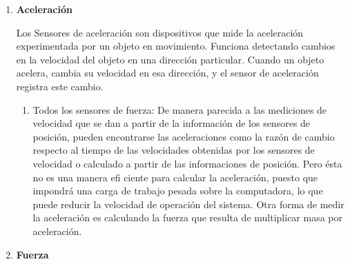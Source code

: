 \begin{enumerate}
\begin{enumerate}
			\begin{figure}[h]
				\centering
				\hfill
			\end{figure}
			
			\end{enumerate}
			
			\item \textbf{Aceleración}
			
			Los Sensores de aceleración son dispositivos que mide la aceleración experimentada por un objeto en movimiento. Funciona detectando cambios en la velocidad del objeto en una dirección particular. Cuando un objeto acelera, cambia su velocidad en esa dirección, y el sensor de aceleración registra este cambio. \cite{Aceleración} \\
			
			\begin{enumerate}
				\item Todos los sensores de fuerza: De manera parecida a las mediciones de velocidad que se dan a partir de la información de los sensores de posición, pueden encontrarse las aceleraciones como la razón de cambio respecto al tiempo de las velocidades obtenidas por los sensores de velocidad o calculado a partir de las informaciones de posición. Pero ésta no es una manera efi ciente para calcular la aceleración, puesto que impondrá una carga de trabajo pesada sobre la computadora, lo que puede reducir la velocidad de operación del sistema. Otra forma de medir la aceleración es calculando la fuerza que resulta de multiplicar masa por aceleración. \cite{saha2010robotics}\\
			\end{enumerate}
				\begin{figure}[h]
				\centering
				\hfill
			\end{figure}
			
			\item \textbf{Fuerza}
			

\end{enumerate}
